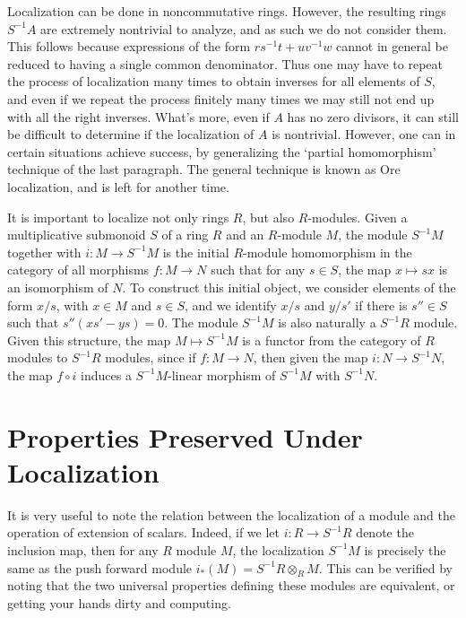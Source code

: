 \begin{remark}
Localization can be done in noncommutative rings. However, the resulting rings $S^{-1}A$ are extremely nontrivial to analyze, and as such we do not consider them. This follows because expressions of the form $rs^{-1}t + uv^{-1}w$ cannot in general be reduced to having a single common denominator. Thus one may have to repeat the process of localization many times to obtain inverses for all elements of $S$, and even if we repeat the process finitely many times we may still not end up with all the right inverses. What's more, even if $A$ has no zero divisors, it can still be difficult to determine if the localization of $A$ is nontrivial. However, one can in certain situations achieve success, by generalizing the `partial homomorphism' technique of the last paragraph. The general technique is known as Ore localization, and is left for another time.
\end{remark}

It is important to localize not only rings $R$, but also $R$-modules. Given a multiplicative submonoid $S$ of a ring $R$ and an $R$-module $M$, the module $S^{-1}M$ together with $i: M \to S^{-1}M$ is the initial $R$-module homomorphism in the category of all morphisms $f: M \to N$ such that for any $s \in S$, the map $x \mapsto sx$ is an isomorphism of $N$. To construct this initial object, we consider elements of the form $x/s$, with $x \in M$ and $s \in S$, and we identify $x/s$ and $y/s'$ if there is $s'' \in S$ such that $s''(xs' - ys) = 0$. The module $S^{-1}M$ is also naturally a $S^{-1}R$ module. Given this structure, the map $M \mapsto S^{-1}M$ is a functor from the category of $R$ modules to $S^{-1}R$ modules, since if $f: M \to N$, then given the map $i: N \to S^{-1}N$, the map $f \circ i$ induces a $S^{-1}M$-linear morphism of $S^{-1}M$ with $S^{-1}N$.

\section{Properties Preserved Under Localization}

It is very useful to note the relation between the localization of a module and the operation of extension of scalars. Indeed, if we let $i: R \to S^{-1}R$ denote the inclusion map, then for any $R$ module $M$, the localization $S^{-1}M$ is precisely the same as the push forward module $i_*(M) = S^{-1}R \otimes_R M$. This can be verified by noting that the two universal properties defining these modules are equivalent, or getting your hands dirty and computing.

